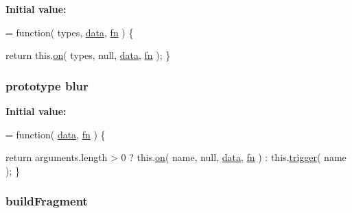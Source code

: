 {\bfseries Initial value\-:}
\begin{DoxyCode}
= \textcolor{keyword}{function}( types, \hyperlink{jquery-1_810_82-vsdoc_8js_a609407b3456fdc3c5671a9fc4a226ff7}{data}, \hyperlink{jquery-1_810_82-vsdoc_8js_acef6bdaf6b9b20fdcca1ea86f0902c3b}{fn} ) \{


        \textcolor{keywordflow}{return} this.\hyperlink{jquery-1_810_82-vsdoc_8js_ae453b412b883f60220d73468ef6c6dbc}{on}( types, null, \hyperlink{jquery-1_810_82-vsdoc_8js_a609407b3456fdc3c5671a9fc4a226ff7}{data}, \hyperlink{jquery-1_810_82-vsdoc_8js_acef6bdaf6b9b20fdcca1ea86f0902c3b}{fn} );
    \}
\end{DoxyCode}
\hypertarget{jquery-1_810_82-vsdoc_8js_a13e7c39ee7152118878db346f297e09c}{
\subsubsection[{blur}]{ {\bf prototype} blur}}\label{jquery-1_810_82-vsdoc_8js_a13e7c39ee7152118878db346f297e09c}
{\bfseries Initial value\-:}
\begin{DoxyCode}
= \textcolor{keyword}{function}( \hyperlink{jquery-1_810_82-vsdoc_8js_a609407b3456fdc3c5671a9fc4a226ff7}{data}, \hyperlink{jquery-1_810_82-vsdoc_8js_acef6bdaf6b9b20fdcca1ea86f0902c3b}{fn} ) \{


        \textcolor{keywordflow}{return} arguments.length > 0 ?
            this.\hyperlink{jquery-1_810_82-vsdoc_8js_ae453b412b883f60220d73468ef6c6dbc}{on}( name, null, \hyperlink{jquery-1_810_82-vsdoc_8js_a609407b3456fdc3c5671a9fc4a226ff7}{data}, \hyperlink{jquery-1_810_82-vsdoc_8js_acef6bdaf6b9b20fdcca1ea86f0902c3b}{fn} ) :
            this.\hyperlink{jquery-1_810_82-vsdoc_8js_a2388c4114d5e3e4eab020f973641519c}{trigger}( name );
    \}
\end{DoxyCode}
\hypertarget{jquery-1_810_82-vsdoc_8js_a7166c09152b93f5b7ecfea8e7a61ba8c}{
\subsubsection[{build\-Fragment}]{ build\-Fragment}}\label{jquery-1_810_82-vsdoc_8js_a7166c09152b93f5b7ecfea8e7a61ba8c}
